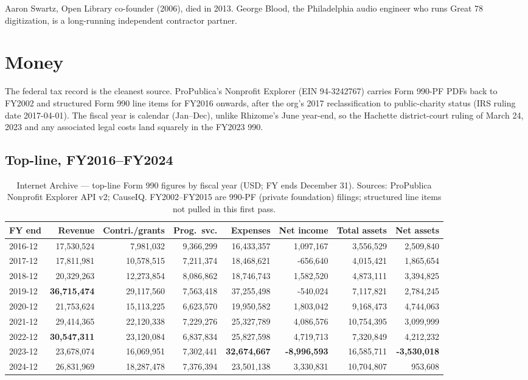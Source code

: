 \documentclass[10pt,letterpaper,twocolumn]{article}
\begin{document}
Aaron Swartz, Open Library co-founder (2006), died in 2013. George Blood, the Philadelphia audio engineer who runs Great 78 digitization, is a long-running independent contractor partner.

\section{Money}\label{sec:money}

The federal tax record is the cleanest source. ProPublica's Nonprofit Explorer (EIN 94-3242767) carries Form 990-PF PDFs back to FY2002 and structured Form 990 line items for FY2016 onwards, after the org's 2017 reclassification to public-charity status (IRS ruling date 2017-04-01). The fiscal year is calendar (Jan--Dec), unlike Rhizome's June year-end, so the Hachette district-court ruling of March 24, 2023 and any associated legal costs land squarely in the FY2023 990.

\subsection{Top-line, FY2016--FY2024}

\begin{table}[t]
\footnotesize
\centering
\setlength{\tabcolsep}{4pt}
\begin{tabularx}{\textwidth}{Xrrrrrrr}
\toprule
\textbf{FY end} & \textbf{Revenue} & \textbf{Contri./grants} & \textbf{Prog.~svc.} & \textbf{Expenses} & \textbf{Net income} & \textbf{Total assets} & \textbf{Net assets} \\
\midrule
2016-12 & 17,530,524 & 7,981,032 & 9,366,299 & 16,433,357 & 1,097,167 & 3,556,529 & 2,509,840 \\
2017-12 & 17,811,981 & 10,578,515 & 7,211,374 & 18,468,621 & -656,640 & 4,015,421 & 1,865,654 \\
2018-12 & 20,329,263 & 12,273,854 & 8,086,862 & 18,746,743 & 1,582,520 & 4,873,111 & 3,394,825 \\
2019-12 & \textbf{36,715,474} & 29,117,560 & 7,563,418 & 37,255,498 & -540,024 & 7,117,821 & 2,784,245 \\
2020-12 & 21,753,624 & 15,113,225 & 6,623,570 & 19,950,582 & 1,803,042 & 9,168,473 & 4,744,063 \\
2021-12 & 29,414,365 & 22,120,338 & 7,229,276 & 25,327,789 & 4,086,576 & 10,754,395 & 3,099,999 \\
2022-12 & \textbf{30,547,311} & 23,120,084 & 6,837,834 & 25,827,598 & 4,719,713 & 7,320,849 & 4,212,232 \\
2023-12 & 23,678,074 & 16,069,951 & 7,302,441 & \textbf{32,674,667} & \textbf{-8,996,593} & 16,585,711 & \textbf{-3,530,018} \\
2024-12 & 26,831,969 & 18,287,478 & 7,376,394 & 23,501,138 & 3,330,831 & 10,704,807 & 953,608 \\
\bottomrule
\end{tabularx}
\caption{Internet Archive --- top-line Form 990 figures by fiscal year (USD; FY ends December 31). Sources: ProPublica Nonprofit Explorer API v2; CauseIQ. FY2002--FY2015 are 990-PF (private foundation) filings; structured line items not pulled in this first pass.}
\label{tab:financials}
\end{table}
\end{document}
